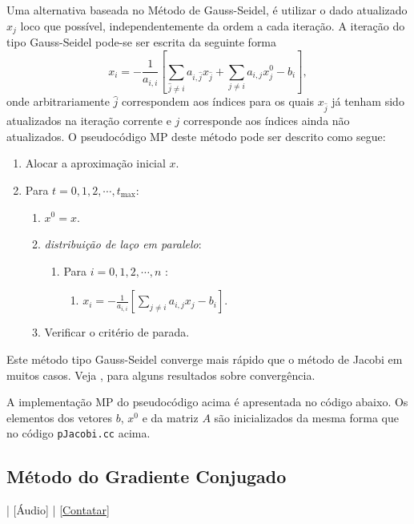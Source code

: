 Uma alternativa baseada no Método de Gauss-Seidel, é utilizar o dado atualizado $x_j$ loco que possível, independentemente da ordem a cada iteração. A iteração do tipo Gauss-Seidel pode-se ser escrita da seguinte forma
\begin{equation}
  x_i = -\frac{1}{a_{i,i}}\left[\sum_{\hat{j}\neq i}a_{i,\hat{j}}x_{\hat{j}} + \sum_{j\neq i}a_{i,j}x^0_j - b_i\right],
\end{equation}
onde arbitrariamente $\hat{j}$ correspondem aos índices para os quais $x_{\hat{j}}$ já tenham sido atualizados na iteração corrente e $j$ corresponde aos índices ainda não atualizados. O pseudocódigo MP deste método pode ser descrito como segue:
\begin{enumerate}
\item Alocar a aproximação inicial $x$.
\item Para $t=0,1,2,\cdots,t_{\text{max}}$:
  \begin{enumerate}
  \item $x^0 = x$.
  \item {\it distribuição de laço em paralelo}:
    \begin{enumerate}
    \item Para $i=0,1,2,\cdots,n$ :
    \begin{enumerate}
    \item $\displaystyle x_i = -\frac{1}{a_{i,i}}\left[\sum_{j\neq i}a_{i,j}x_j - b_i\right]$.
    \end{enumerate}
  \end{enumerate}
  \item Verificar o critério de parada.
  \end{enumerate}
\end{enumerate}
Este método tipo Gauss-Seidel converge mais rápido que o método de Jacobi em muitos casos. Veja \cite[p.~151--153]{Bertsekas2015a}, para alguns resultados sobre convergência.


A implementação MP do pseudocódigo acima é apresentada no código abaixo. Os elementos dos vetores $b$, $x^0$ e da matriz $A$ são inicializados da mesma forma que no código \verb+pJacobi.cc+ acima.



\subsection{Método do Gradiente Conjugado}

\begin{flushright}
  [Vídeo] | [Áudio] | \href{https://phkonzen.github.io/notas/contato.html}{[Contatar]}
\end{flushright}

